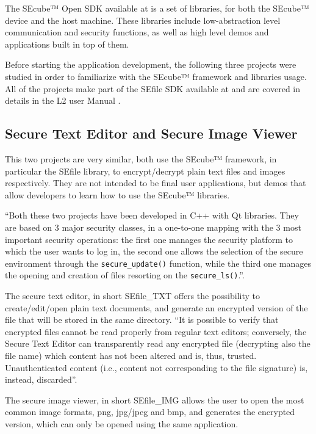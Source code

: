 The SEcube™ Open SDK available at \cite{SEcubeRes} is a set of libraries, for both the SEcube™ device and the host machine. These libraries include low-abstraction level communication and security functions, as well as high level demos and applications built in top of them.

Before starting the application development, the following three projects were studied in order to familiarize with the SEcube™ framework and libraries usage. All of the projects make part of the SEfile SDK available at \cite{SEcubeRes} and are covered in details in the L2 user Manual \cite{L2UserMan}.

\subsection{Secure Text Editor and Secure Image Viewer}

This two projects are very similar, both use the SEcube™ framework, in particular the SEfile library, to encrypt/decrypt plain text files and images respectively. They are not intended to be final user applications, but demos that allow developers to learn how to use the SEcube™ libraries.

``Both these two projects have been developed in C++ with Qt libraries. They are based on 3
major security classes, in a one-to-one mapping with the 3 most important security operations: the first one manages the security platform to which the user wants to log in, the second one allows the selection of the secure environment through the \texttt{secure\_update()} function, while the third one manages the opening and creation of files resorting on the \texttt{secure\_ls()}.''\citep{L2UserMan}.

The secure text editor, in short SEfile\_TXT offers the possibility to create/edit/open plain text documents, and generate an encrypted version of the file that will be stored in the same directory. ``It is possible to verify that encrypted files cannot be read properly from regular text editors; conversely, the Secure Text Editor can transparently read any encrypted file (decrypting also the file name) which content has not been altered and is, thus, trusted. Unauthenticated content (i.e., content not corresponding to the file signature) is, instead, discarded''.

The secure image viewer, in short SEfile\_IMG allows the user to open the most common image formats, png, jpg/jpeg and bmp, and generates the encrypted version, which can only be opened using the same application.

